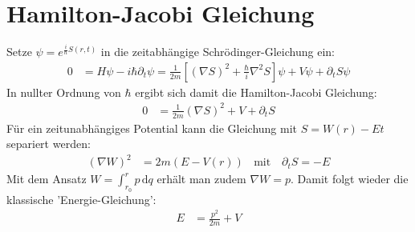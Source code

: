 \documentclass[a4paper,12pt]{article}
\newcommand{\intx}{}
\newcommand{\kla}{}
\newcommand{\klam}{}
\newcommand{\tecxt}{}
\begin{document}
\section{Hamilton-Jacobi Gleichung}
Setze $\psi=e^{\frac{i}{\hbar}S(r,t)}$ in die zeitabhängige Schrödinger-Gleichung ein:
\begin{align*}
0&=H\psi-i\hbar\partial_t\psi=\frac{1}{2m}\klam\left[ {(\nabla S)^2+\frac{\hbar}{i}\nabla^2S} \right]\psi+V\psi+\partial_tS\psi
\end{align*}
In nullter Ordnung von $\hbar$ ergibt sich damit die Hamilton-Jacobi Gleichung:
\begin{align*}
0&=\frac{1}{2m}\kla\left( {\nabla S} \right)^2+V+\partial_tS
\end{align*}
Für ein zeitunabhängiges Potential kann die Gleichung mit $S=W(r)-Et$ separiert werden:
\begin{align*}
(\nabla W)^2&=2m(E-V(r))\ \ \ \ \tecxt\text{mit }\ \ \ \partial_tS=-E
\end{align*}
Mit dem Ansatz $W=\intx\int_{r_0}^{r}p\,\mathrm{d}q$ erhält man zudem $\nabla W=p$. Damit folgt wieder die klassische 'Energie-Gleichung':
\begin{align*}
E&=\frac{p^2}{2m}+V
\end{align*}
\end{document}
